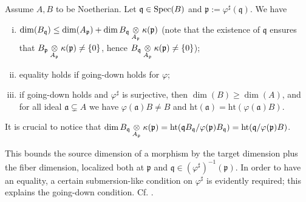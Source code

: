 \begin{proposition}\label{prop:fiber-ineq}
	Assume $A, B$ to be Noetherian. Let $\mathfrak{q} \in \operatorname{Spec}(B)$ and $\mathfrak{p} := \varphi^\sharp(\mathfrak{q})$. We have
	\begin{enumerate}[(i)]
		\item $\dim(B_{\mathfrak{q}}) \leq \dim(A_{\mathfrak{p}}) + \dim B_{\mathfrak{q}} \underset{A_{\mathfrak{p}}}{\otimes} \kappa(\mathfrak{p})$ (note that the existence of $\mathfrak{q}$ ensures that $B_{\mathfrak{p}} \underset{A_{\mathfrak{p}}}{\otimes} \kappa(\mathfrak{p}) \neq \{0\}$, hence $B_{\mathfrak{q}} \underset{A_{\mathfrak{p}}}{\otimes} \kappa(\mathfrak{p}) \neq \{0\}$);
		\item equality holds if going-down holds for $\varphi$;
		\item if going-down holds and $\varphi^\sharp$ is surjective, then $\dim(B) \geq \dim(A)$, and for all ideal $\mathfrak{a} \subsetneq A$ we have $\varphi(\mathfrak{a}) B \neq B$ and $\mathrm{ht}(\mathfrak{a}) = \mathrm{ht}(\varphi(\mathfrak{a})B)$.
	\end{enumerate}
\end{proposition}

It is crucial to notice that $\dim B_{\mathfrak{q}} \underset{A_{\mathfrak{p}}}{\otimes} \kappa(\mathfrak{p}) = \text{ht}(\mathfrak{q}B_{\mathfrak{q}}/\varphi(\mathfrak{p}) B_{\mathfrak{q}}) = \text{ht}(\mathfrak{q}/\varphi(\mathfrak{p})B)$.

This bounds the source dimension of a morphism by the target dimension plus the fiber dimension, localized both at $\mathfrak{p}$ and $\mathfrak{q} \in (\varphi^\sharp)^{-1}(\mathfrak{p})$. In order to have an equality, a certain submersion-like condition on $\varphi^\sharp$ is evidently required; this explains the going-down condition. Cf. \cite[(6.H)]{Mat80}.


